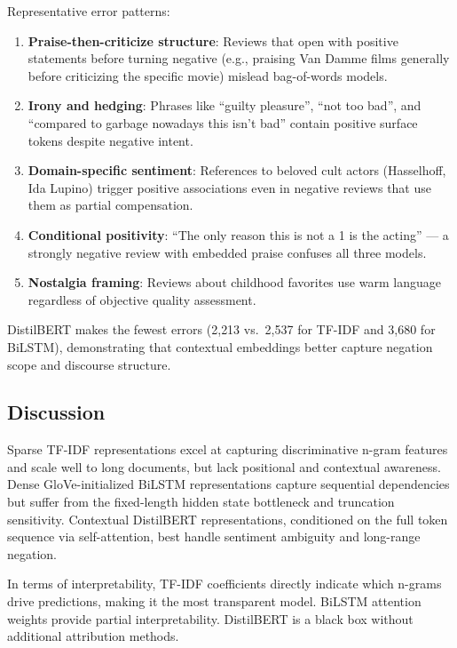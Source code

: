 \documentclass[12pt,a4paper]{article}
\begin{document}
Representative error patterns:

\begin{enumerate}
    \item \textbf{Praise-then-criticize structure}: Reviews that open with positive statements before turning negative (e.g., praising Van Damme films generally before criticizing the specific movie) mislead bag-of-words models.
    \item \textbf{Irony and hedging}: Phrases like ``guilty pleasure'', ``not too bad'', and ``compared to garbage nowadays this isn't bad'' contain positive surface tokens despite negative intent.
    \item \textbf{Domain-specific sentiment}: References to beloved cult actors (Hasselhoff, Ida Lupino) trigger positive associations even in negative reviews that use them as partial compensation.
    \item \textbf{Conditional positivity}: ``The only reason this is not a 1 is the acting'' — a strongly negative review with embedded praise confuses all three models.
    \item \textbf{Nostalgia framing}: Reviews about childhood favorites use warm language regardless of objective quality assessment.
\end{enumerate}

DistilBERT makes the fewest errors (2{,}213 vs.\ 2{,}537 for TF-IDF and 3{,}680 for BiLSTM), demonstrating that contextual embeddings better capture negation scope and discourse structure.

\subsection{Discussion}

Sparse TF-IDF representations excel at capturing discriminative n-gram features and scale well to long documents, but lack positional and contextual awareness. Dense GloVe-initialized BiLSTM representations capture sequential dependencies but suffer from the fixed-length hidden state bottleneck and truncation sensitivity. Contextual DistilBERT representations, conditioned on the full token sequence via self-attention, best handle sentiment ambiguity and long-range negation.

In terms of interpretability, TF-IDF coefficients directly indicate which n-grams drive predictions, making it the most transparent model. BiLSTM attention weights provide partial interpretability. DistilBERT is a black box without additional attribution methods.
\end{document}
